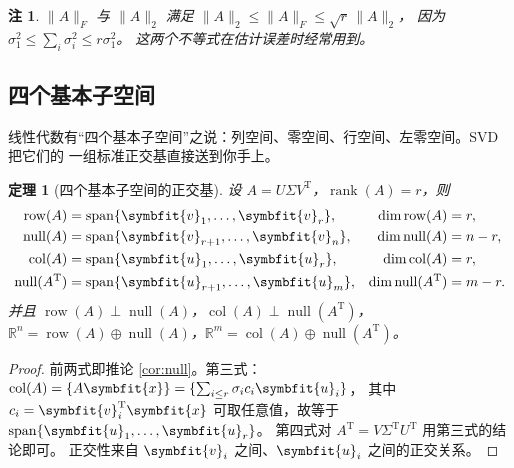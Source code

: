 \documentclass[UTF8, 11pt, a4paper, fontset=windows]{ctexart}
\theoremstyle{cnthm}
\newtheorem{thm}{定理}[section]
\theoremstyle{cndef}
\newtheorem{rem}[defn]{注}
\newcommand{\T}{^{\mathrm{T}}}
\newcommand{\R}{\mathbb{R}}
\newcommand{\nrm}[1]{\lVert #1 \rVert}
\DeclareMathOperator{\rank}{rank}
\DeclareMathOperator{\Span}{span}
\DeclareMathOperator{\Null}{null}
\DeclareMathOperator{\Col}{col}
\DeclareMathOperator{\Row}{row}
\newcommand{\bu}{\symbfit{u}}
\newcommand{\x}{\symbfit{x}}
\newcommand{\vv}{\symbfit{v}}
\begin{document}
\begin{rem}
$\nrm{A}_F$ 与 $\nrm{A}_2$ 满足
$\nrm{A}_2\le\nrm{A}_F\le\sqrt{r}\,\nrm{A}_2$，
因为 $\sigma_1^2\le\sum_i\sigma_i^2\le r\sigma_1^2$。
这两个不等式在估计误差时经常用到。
\end{rem}

\subsection{四个基本子空间}

线性代数有“四个基本子空间”之说：列空间、零空间、行空间、左零空间。SVD 把它们的
一组标准正交基直接送到你手上。

\begin{thm}[四个基本子空间的正交基]\label{thm:four-subspaces}
设 $A=U\Sigma V\T$，$\rank(A)=r$，则
\begin{align}
  \Row(A)&=\Span\{\vv_1,\dots,\vv_r\}, & \dim\Row(A)&=r,\\
  \Null(A)&=\Span\{\vv_{r+1},\dots,\vv_n\}, & \dim\Null(A)&=n-r,\\
  \Col(A)&=\Span\{\bu_1,\dots,\bu_r\}, & \dim\Col(A)&=r,\\
  \Null(A\T)&=\Span\{\bu_{r+1},\dots,\bu_m\}, & \dim\Null(A\T)&=m-r .
\end{align}
并且 $\Row(A)\perp\Null(A)$，$\Col(A)\perp\Null(A\T)$，
$\R^n=\Row(A)\oplus\Null(A)$，$\R^m=\Col(A)\oplus\Null(A\T)$。
\end{thm}

\begin{proof}
前两式即推论 \ref{cor:null}。第三式：$\Col(A)=\{A\x\}=\{\sum_{i\le r}\sigma_ic_i\bu_i\}$，
其中 $c_i=\vv_i\T\x$ 可取任意值，故等于 $\Span\{\bu_1,\dots,\bu_r\}$。
第四式对 $A\T=V\Sigma\T U\T$ 用第三式的结论即可。
正交性来自 $\vv_i$ 之间、$\bu_i$ 之间的正交关系。
\end{proof}
\end{document}
